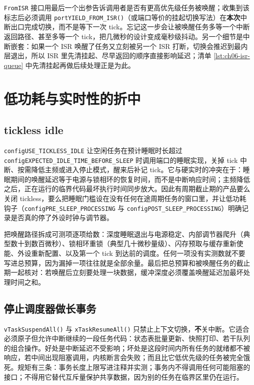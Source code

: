 \documentclass[12pt,a4paper,fontset=fandol]{ctexbook}
\newcommand{\Fn}[1]{\texttt{#1()}}
\newcommand{\Tp}[1]{\texttt{#1}}
\newcommand{\Bk}{\discretionary{}{}{}}
\begin{document}
\Tp{FromISR} 接口用最后一个出参告诉调用者是否有更高优先级任务被唤醒；收集到该标志后必须调用 \Fn{portYIELD\_FROM\_ISR}（或端口等价的挂起切换写法）在\textbf{本次}中断出口完成切换，而不是等下一次 tick。忘记这一步会让被唤醒任务多等一个中断返回路径、甚至多等一个 tick，把几微秒的设计变成毫秒级抖动。另一个细节是中断嵌套：如果一个 ISR 唤醒了任务又立刻被另一个 ISR 打断，切换会推迟到最内层退出，所以 ISR 里先清挂起、尽早返回的顺序直接影响延迟；清单 \ref{lst:ch06-isr-queue} 中先清挂起再做后续处理正是为此。

\section{低功耗与实时性的折中}

\subsection{tickless idle}

\Tp{configUSE{\Bk}\_TICKLESS{\Bk}\_IDLE} 让空闲任务在预计睡眠时长超过 \Tp{configEXPECTED{\Bk}\_IDLE{\Bk}\_TIME{\Bk}\_BEFORE{\Bk}\_SLEEP} 时调用端口的睡眠实现，关掉 tick 中断、按需降低主频或进入停止模式，醒来后补记 tick。它与硬实时的冲突在于：睡眠期间的唤醒延迟等于电源与锁相环的恢复时间，而不是中断响应时间；主频降低之后，正在运行的临界代码最坏执行时间同步放大。因此有周期截止期的产品要么关闭 tickless，要么把睡眠门槛设在没有任何在途周期任务的窗口里，并让低功耗钩子（\Tp{configPRE\_SLEEP\_PROCESSING} 与 \Tp{configPOST\_SLEEP\_PROCESSING}）明确记录是否真的停了外设时钟与调节器。

\begin{note}[title={唤醒延迟预算的写法}]
把唤醒路径拆成可测项逐项给数：深度睡眠退出与电源稳定、内部调节器爬升（典型数十到数百微秒）、锁相环重锁（典型几十微秒量级）、闪存预取与缓存重新使能、外设重新配置、以及第一个 tick 到达前的调度。任何一项没有实测数就不要写进总预算，因为漏掉一项往往就是全部余量。最后把总预算和被唤醒任务的截止期一起核对：若唤醒后立刻要处理一块数据，缓冲深度必须覆盖唤醒延迟加最坏处理时间之和。
\end{note}

\subsection{停止调度器做长事务}

\Fn{vTaskSuspendAll} 与 \Fn{xTaskResumeAll} 只禁止上下文切换，\textbf{不}关中断。它适合必须原子但允许中断继续的一段任务代码：状态表批量更新、快照打印、若干队列的组合操作。好处是中断延迟不受影响；坏处是这段时间内所有任务的就绪都不被响应，若中间出现阻塞调用，内核断言会失败；而且比它低优先级的任务被完全饿死。规矩有三条：事务长度上限写进注释并实测；事务内不得调用任何可能阻塞的接口；不得用它替代互斥量保护共享数据，因为别的任务在临界区里仍在运行。
\end{document}
